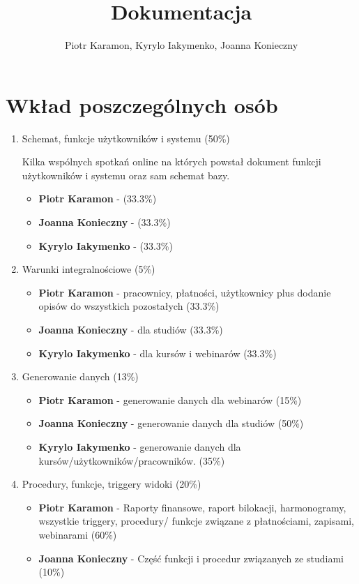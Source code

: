 \documentclass[11pt]{article}
\author{Piotr Karamon, Kyrylo Iakymenko, Joanna Konieczny}
\date{}
\title{Dokumentacja}
\begin{document}
\maketitle
\tableofcontents

\section{Wkład poszczególnych osób}
\label{sec:org7f56e78}
\begin{enumerate}
\item Schemat, funkcje użytkowników i systemu (50\%)

Kilka wspólnych spotkań online na których powstał dokument funkcji użytkowników i systemu oraz sam schemat bazy.
\begin{itemize}
\item \textbf{Piotr Karamon} - (33.3\%)
\item \textbf{Joanna Konieczny} - (33.3\%)
\item \textbf{Kyrylo Iakymenko} - (33.3\%)
\end{itemize}
\item Warunki integralnościowe (5\%)
\begin{itemize}
\item \textbf{Piotr Karamon} - pracownicy, płatności, użytkownicy plus dodanie opisów do wszystkich pozostałych (33.3\%)
\item \textbf{Joanna Konieczny} - dla studiów (33.3\%)
\item \textbf{Kyrylo Iakymenko} - dla kursów i webinarów (33.3\%)
\end{itemize}
\item Generowanie danych (13\%)
\begin{itemize}
\item \textbf{Piotr Karamon} - generowanie danych dla webinarów (15\%)
\item \textbf{Joanna Konieczny} - generowanie danych dla studiów (50\%)
\item \textbf{Kyrylo Iakymenko} - generowanie danych dla kursów/użytkowników/pracowników. (35\%)
\end{itemize}
\item Procedury, funkcje, triggery widoki (20\%)
\begin{itemize}
\item \textbf{Piotr Karamon} - Raporty finansowe, raport bilokacji, harmonogramy, wszystkie triggery,
procedury/ funkcje związane z płatnościami, zapisami, webinarami (60\%)
\item \textbf{Joanna Konieczny} - Część funkcji i procedur związanych ze studiami (10\%)

\end{itemize}
\end{enumerate}
\end{document}
